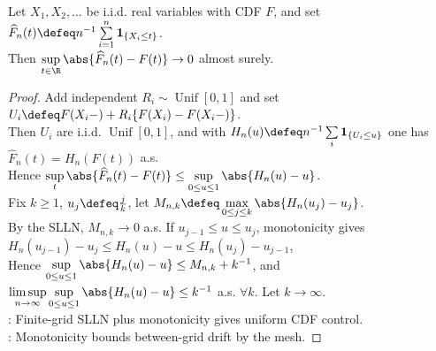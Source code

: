 \begin{theorem} \label{thm:glivenko-cantelli} \\
Let $X_1,X_2,\ldots$ be i.i.d. real variables with CDF $F$, and set $\widehat{F}_n(t)\defeq n^{-1}\sum\limits_{i=1}^n\mathbf{1}_{\{X_i\leq t\}}$.\\
Then $\sup\limits_{t\in\R}\abs{\widehat{F}_n(t)-F(t)}\to0$ almost surely.
\begin{proof} Add independent $R_i\sim\operatorname{Unif}[0,1]$ and set $U_i\defeq F(X_i-)+R_i\{F(X_i)-F(X_i-)\}$.\\
Then $U_i$ are i.i.d. $\operatorname{Unif}[0,1]$, and with $H_n(u)\defeq n^{-1}\sum\limits_i\mathbf{1}_{\{U_i\leq u\}}$ one has $\widehat{F}_n(t)=H_n(F(t))$ a.s.\\
Hence $\sup\limits_t\abs{\widehat{F}_n(t)-F(t)}\leq\sup\limits_{0\leq u\leq1}\abs{H_n(u)-u}$.\\
Fix $k\geq1$, $u_j\defeq\frac{j}{k}$, let $M_{n,k}\defeq\max\limits_{0\leq j\leq k}\abs{H_n(u_j)-u_j}$.\\
By the SLLN, $M_{n,k}\to0$ a.s. If $u_{j-1}\leq u\leq u_j$, monotonicity gives $H_n(u_{j-1})-u_j\leq H_n(u)-u\leq H_n(u_j)-u_{j-1}$,\\
Hence $\sup\limits_{0\leq u\leq1}\abs{H_n(u)-u}\leq M_{n,k}+k^{-1}$, and $\limsup\limits_{n\to\infty}\sup\limits_{0\leq u\leq1}\abs{H_n(u)-u}\leq k^{-1}$ a.s. $\forall k$. Let $k\to\infty$.\\
: Finite-grid SLLN plus monotonicity gives uniform CDF control.\\
: Monotonicity bounds between-grid drift by the mesh.
\end{proof}
\end{theorem}

